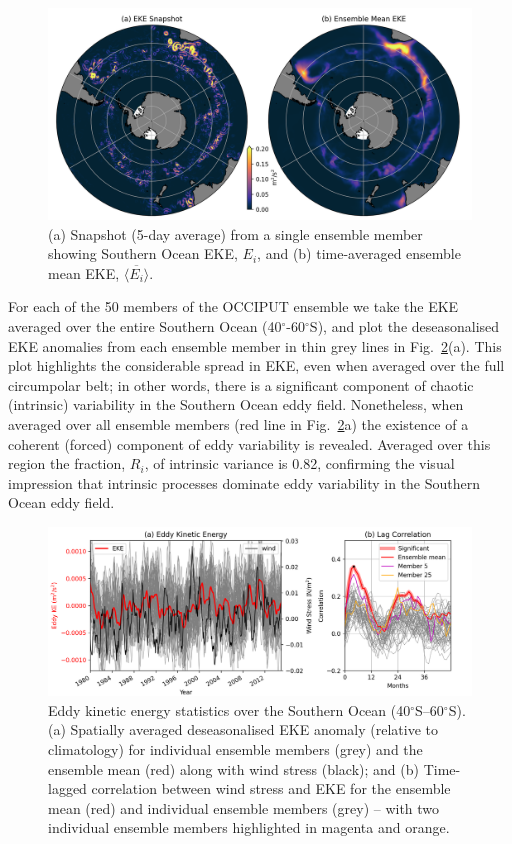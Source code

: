 \documentclass[linenumbers]{agujournal2019}
\begin{document}
\begin{figure}[ht]
\begin{center}
\includegraphics[width=\hsize]{Figure1}
\caption{(a) Snapshot (5-day average) from a single ensemble member showing Southern Ocean EKE, $E_i$, and (b) time-averaged ensemble mean EKE, $\overline{\langle E_i\rangle}$.}
\label{Fig:1}
\end{center}
\end{figure}

For each of the 50 members of the OCCIPUT ensemble we take the EKE averaged over the entire Southern Ocean (40$^\circ$-60$^\circ$S), and plot the deseasonalised EKE anomalies from each ensemble member in thin grey lines in Fig.~\ref{Fig:2}(a). 
This plot highlights the considerable spread in EKE, even when averaged over the full circumpolar belt; in other words, there is a significant component of chaotic (intrinsic) variability in the Southern Ocean eddy field.
Nonetheless, when averaged over all ensemble members (red line in Fig.~\ref{Fig:2}a) the existence of a coherent (forced) component of eddy variability is revealed.
Averaged over this region the fraction, $R_i$, of intrinsic variance is 0.82, confirming the visual impression that intrinsic processes dominate eddy variability in the Southern Ocean eddy field.

\begin{figure}[t]
\begin{center}
\includegraphics[width=\hsize]{Figure2}
\caption{Eddy kinetic energy statistics over the Southern Ocean (40$^\circ$S--60$^\circ$S). (a) Spatially averaged deseasonalised EKE anomaly (relative to climatology) for individual ensemble members (grey) and the ensemble mean (red) along with wind stress (black); and (b) Time-lagged correlation between wind stress and EKE for the ensemble mean (red) and individual ensemble  members (grey) -- with two individual ensemble members highlighted in magenta and orange.}
\label{Fig:2}
\end{center}
\end{figure}
\end{document}
